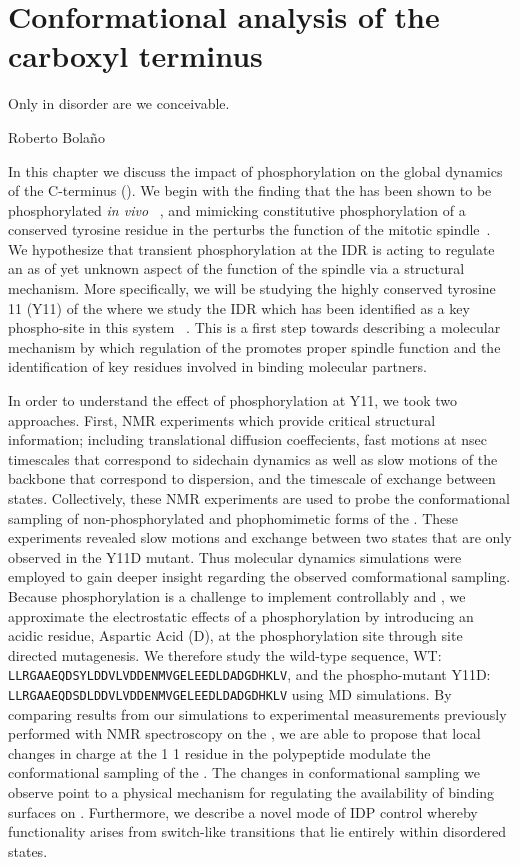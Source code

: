 \chapter{Conformational analysis of the \tub carboxyl terminus}

\epigraph{Only in disorder are we conceivable.}{Roberto Bola\~no}

In this chapter we discuss the impact of phosphorylation on the global dynamics of the \tub C-terminus (\gct). We begin with the finding that the \gct has been shown to be phosphorylated {\it in vivo} ~\cite{keck2011cell}, and mimicking constitutive phosphorylation of a conserved tyrosine residue in the \gct perturbs the function of the mitotic spindle~\cite{vogel2001phosphorylation}. We hypothesize  that  transient phosphorylation at  the \gct IDR  is acting  to  regulate an as of yet unknown aspect of the function of the spindle via a structural mechanism. More specifically, we will be studying  the highly conserved tyrosine 11 (Y11) of the \gct where we study the IDR which has been identified as a key phospho-site  in this system ~\cite{vogel2001phosphorylation}. This is a first step towards describing a molecular mechanism by which regulation of the \gct promotes proper spindle function and the identification of key residues involved in binding molecular partners. 

In order to understand the effect of phosphorylation at Y11, we took two approaches. First, NMR experiments which provide critical structural information; including translational diffusion coeffecients, fast motions at nsec timescales that correspond to sidechain dynamics as well as slow motions of the backbone that correspond to dispersion, and the timescale of exchange between states. Collectively, these NMR experiments are used to probe the conformational sampling  of non-phosphorylated  and  phophomimetic forms of the  \gct. These experiments revealed slow motions and exchange between two states that are only observed in the Y11D mutant.  Thus molecular dynamics simulations were employed to gain deeper insight regarding the observed comformational sampling. Because phosphorylation is  a challenge to  implement  controllably  \vivo and \vitro, we approximate the electrostatic  effects of a phosphorylation by introducing an acidic residue, Aspartic  Acid (D),  at  the phosphorylation site through site directed mutagenesis. We therefore study the wild-type sequence, WT: \texttt{LLRGAAEQDSYLDDVLVDDENMVGELEEDLDADGDHKLV}, and the phospho-mutant Y11D: \texttt{LLRGAAEQDSDLDDVLVDDENMVGELEEDLDADGDHKLV} using MD simulations. By comparing results from our simulations to experimental measurements previously performed with NMR spectroscopy on the \gct, we are able to propose that local changes in charge at the 1	1 residue in the polypeptide modulate the conformational sampling of the \gct. The changes in conformational sampling we observe point to a physical mechanism for regulating the availability of binding surfaces on \tub. Furthermore, we describe a novel mode of IDP control whereby functionality arises from switch-like transitions that lie entirely within disordered states.

